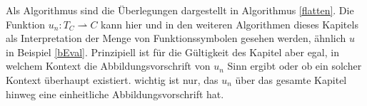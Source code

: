 \documentclass{scrartcl}
\numberwithin{figure}{section} %
\theoremstyle{definition} %
\begin{document}
Als Algorithmus sind die Überlegungen dargestellt in Algorithmus \ref{flatten}.
Die Funktion $u_n \colon T_C \rightharpoonup C$ kann hier und in den weiteren Algorithmen dieses Kapitels als \grqq{} Interpretation der Menge von Funktionssymbolen gesehen werden, ähnlich $u$ in Beispiel \ref{bEval}. Prinzipiell ist für die Gültigkeit des Kapitel aber egal, in welchem Kontext die Abbildungsvorschrift von $u_n$ Sinn ergibt oder ob ein solcher Kontext überhaupt existiert. wichtig ist nur, das $u_n$ über das gesamte Kapitel hinweg eine einheitliche Abbildungsvorschrift hat.

\begin{algorithm}
\DontPrintSemicolon
\caption{$\mathrm{flatten} \colon T \rightarrow T$}\label{flatten}
\end{algorithm}
\end{document}

